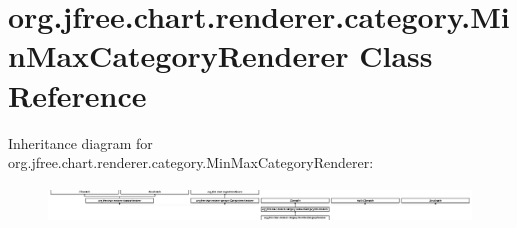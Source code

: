 \hypertarget{classorg_1_1jfree_1_1chart_1_1renderer_1_1category_1_1_min_max_category_renderer}{}\section{org.\+jfree.\+chart.\+renderer.\+category.\+Min\+Max\+Category\+Renderer Class Reference}
\label{classorg_1_1jfree_1_1chart_1_1renderer_1_1category_1_1_min_max_category_renderer}
Inheritance diagram for org.\+jfree.\+chart.\+renderer.\+category.\+Min\+Max\+Category\+Renderer\+:\begin{figure}[H]
\begin{center}
\leavevmode
\includegraphics[height=0.962199cm]{classorg_1_1jfree_1_1chart_1_1renderer_1_1category_1_1_min_max_category_renderer}
\end{center}
\end{figure}
